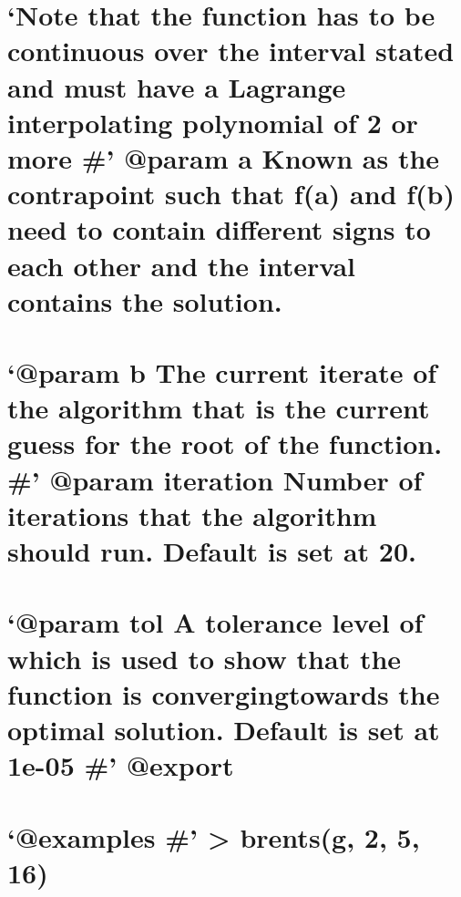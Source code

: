 \documentclass[]{article}
\begin{document}
{\section{\texorpdfstring{`Note that the function has to be continuous
over the interval stated and must have a Lagrange interpolating
polynomial of 2 or more \#' @param a Known as the contrapoint such that
f(a) and f(b) need to contain different signs to each other and the
interval contains the
solution.}{Note that the function has to be continuous over the interval stated and must have a Lagrange interpolating polynomial of 2 or more \# @param a Known as the contrapoint such that f(a) and f(b) need to contain different signs to each other and the interval contains the solution.}}\label{note-that-the-function-has-to-be-continuous-over-the-interval-stated-and-must-have-a-lagrange-interpolating-polynomial-of-2-or-more-param-a-known-as-the-contrapoint-such-that-fa-and-fb-need-to-contain-different-signs-to-each-other-and-the-interval-contains-the-solution.}

\section{\texorpdfstring{`@param b The current iterate of the algorithm
that is the current guess for the root of the function. \#' @param
iteration Number of iterations that the algorithm should run. Default is
set at
20.}{@param b The current iterate of the algorithm that is the current guess for the root of the function. \# @param iteration Number of iterations that the algorithm should run. Default is set at 20.}}\label{param-b-the-current-iterate-of-the-algorithm-that-is-the-current-guess-for-the-root-of-the-function.-param-iteration-number-of-iterations-that-the-algorithm-should-run.-default-is-set-at-20.}

\section{\texorpdfstring{`@param tol A tolerance level of which is used
to show that the function is convergingtowards the optimal solution.
Default is set at 1e-05 \#'
@export}{@param tol A tolerance level of which is used to show that the function is convergingtowards the optimal solution. Default is set at 1e-05 \# @export}}\label{param-tol-a-tolerance-level-of-which-is-used-to-show-that-the-function-is-convergingtowards-the-optimal-solution.-default-is-set-at-1e-05-export}

\section{\texorpdfstring{`@examples \#' \textgreater{} brents(g, 2, 5,
16)}{@examples \# \textgreater{} brents(g, 2, 5, 16)}}\label{examples-brentsg-2-5-16}

}
\end{document}
